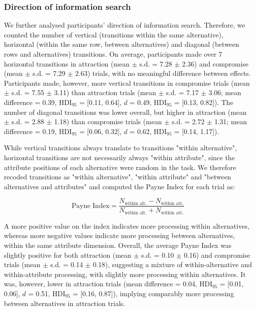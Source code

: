 \documentclass[11pt, a4paper]{article}
\begin{document}
\begin{refsection}
\subsubsection*{Direction of information search}
We further analysed participants’ direction of information search. Therefore, we counted the number of vertical (transitions within the same alternative), horizontal (within the same row, between alternatives) and diagonal (between rows and alternatives) transitions. On average, participants made over 7 horizontal transitions in attraction (mean $\pm$ s.d. = 7.28 $\pm$ 2.36) and compromise (mean $\pm$ s.d. = 7.29 $\pm$ 2.63) trials, with no meaningful difference between effects. Participants made, however, more vertical transitions in compromise trials (mean $\pm$ s.d. = 7.55 $\pm$ 3.11) than attraction trials (mean $\pm$ s.d. = 7.17 $\pm$ 3.06; mean difference = 0.39, HDI$_{95}$  = [0.11, 0.64], $d$ = 0.49, HDI$_{95}$  = [0.13, 0.82]). The number of diagonal transitions was lower overall, but higher in attraction (mean $\pm$ s.d. = 2.88 $\pm$ 1.18) than compromise trials (mean $\pm$ s.d. = 2.72 $\pm$ 1.31; mean difference = 0.19, HDI$_{95}$  = [0.06, 0.32], $d$ = 0.62, HDI$_{95}$  = [0.14, 1.17]).

While vertical transitions always translate to transitions "within alternative", horizontal transitions are not necessarily always "within attribute", since the attribute positions of each alternative were random in the task. We therefore recoded transitions as "within alternative", "within attribute" and "between alternatives and attributes" and computed the Payne Index \parencite{payne1976TaskComplexityContingent} for each trial as:

\begin{equation}
    \text{Payne Index} = \frac{N_{\text{within~alt.}} - N_{\text{within~att.}}}{N_{\text{within~alt.}} + N_{\text{within~att.}}}
\end{equation}

A more positive value on the index indicates more processing within alternatives, whereas more negative values indicate more processing between alternatives, within the same attribute dimension. Overall, the average Payne Index was slightly positive for both attraction (mean $\pm$ s.d. = 0.10 $\pm$ 0.16) and compromise trials (mean $\pm$ s.d. = 0.14 $\pm$ 0.18), suggesting a mixture of within-alternative and within-attribute processing, with slightly more processing within alternatives. It was, however, lower in attraction trials (mean difference = 0.04, HDI$_{95}$  = [0.01, 0.06], $d$ = 0.51, HDI$_{95}$  = [0.16, 0.87]), implying comparably more processing between alternatives in attraction trials.
\clearpage


\end{refsection}
\end{document}
